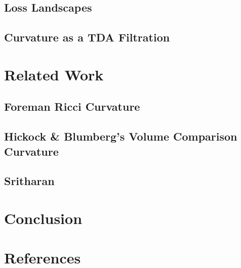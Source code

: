\documentclass[
  letterpaper,
  DIV=11,
  numbers=noendperiod]{scrartcl}
\theoremstyle{plain}
\theoremstyle{definition}
\theoremstyle{plain}
\theoremstyle{definition}
\theoremstyle{plain}
\theoremstyle{remark}
\begin{document}
\subsection{Loss Landscapes}\label{loss-landscapes}

\subsection{Curvature as a TDA
Filtration}\label{curvature-as-a-tda-filtration}

\section{Related Work}\label{related-work}

\subsection{Foreman Ricci Curvature}\label{foreman-ricci-curvature}

\subsection{Hickock \& Blumberg's Volume Comparison
Curvature}\label{hickock-blumbergs-volume-comparison-curvature}

\subsection{Sritharan}\label{sritharan}

\section{Conclusion}\label{conclusion}

\section*{References}\label{references}
\end{document}
